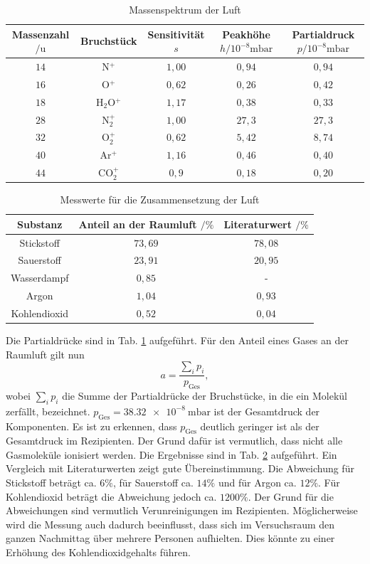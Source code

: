 \begin{table}[tb]
 \centering
 \caption{Massenspektrum der Luft}
 \label{tab:41}
 \hskip-1.0cm
 \begin{tabular}{ccccc} \toprule
   Massenzahl $/\si{\amu}$ & Bruchstück & Sensitivität $s$ & Peakhöhe $h/10^{-8}\si{\milli \bar}$ & Partialdruck $p/10^{-8}\si{\milli \bar}$ \\ \midrule
   $14$ & N$^{+}$ & $1,00$ & $0,94$ & $0,94$\\
   $16$ & O$^{+}$ & $0,62$ & $0,26$ & $0,42$ \\
   $18$ & H$_{2}$O$^{+}$ & $1,17$ & $0,38$ & $0,33$ \\
   $28$ & N$_{2}^{+}$ & $1,00$ & $27,3$ & $27,3$ \\
   $32$ & O$_{2}^{+}$ & $0,62$ & $5,42$ & $8,74$ \\
   $40$ & Ar$^{+}$ & $1,16$ & $0,46$ & $0,40$ \\
   $44$ & CO$_{2}^{+}$ & $0,9$ & $0,18$ & $0,20$ \\ \bottomrule
 \end{tabular}
\end{table}

\begin{table}[tb]
 \centering
 \caption{Messwerte für die Zusammensetzung der Luft}
 \label{tab:42}
 \begin{tabular}{ccc} \toprule
   Substanz & Anteil an der Raumluft $/\%$ & Literaturwert \cite{lubw} $/\%$ \\ \midrule
   Stickstoff & $73,69$ & $78,08$ \\
   Sauerstoff & $23,91$ & $20,95$ \\
   Wasserdampf & $0,85$ & - \\
   Argon & $1,04$ & $0,93$ \\
   Kohlendioxid & $0,52$ & $0,04$ \\ \bottomrule
 \end{tabular}

\end{table}


Die Partialdrücke sind in Tab. \ref{tab:41} aufgeführt. Für den Anteil eines Gases an der Raumluft gilt nun
\begin{equation}
 a = \frac{\sum_{i}p_{i}}{p_{\textrm{Ges}}},
\end{equation}
wobei $\sum_{i}p_{i}$ die Summe der Partialdrücke der Bruchstücke, in die ein Molekül zerfällt, bezeichnet. $p_{\textrm{Ges}}=\SI{38,32e-8}{\milli\bar}$ ist der Gesamtdruck der Komponenten. Es ist zu erkennen, dass $p_{\textrm{Ges}}$ deutlich geringer ist als der Gesamtdruck im Rezipienten.
Der Grund dafür ist vermutlich, dass nicht alle Gasmoleküle ionisiert werden.
Die Ergebnisse sind in Tab. \ref{tab:42} aufgeführt. Ein Vergleich mit Literaturwerten \cite{lubw} zeigt gute Übereinstimmung. Die Abweichung für Stickstoff beträgt ca. $6\%$, für Sauerstoff ca. $14\%$ und für Argon ca. $12\%$. Für Kohlendioxid beträgt die Abweichung jedoch ca. $1200\%$. Der Grund für die Abweichungen sind vermutlich Verunreinigungen im Rezipienten.
Möglicherweise wird die Messung auch dadurch beeinflusst, dass sich im Versuchsraum den ganzen Nachmittag über mehrere Personen aufhielten. Dies könnte zu einer Erhöhung des Kohlendioxidgehalts führen.

